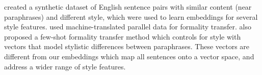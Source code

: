 \citet{patel2024styledistancestrongercontentindependentstyle} %
created a synthetic dataset of English sentence pairs with similar content (near paraphrases) and different style, which were used to learn embeddings for several style features. \citet{lai-etal-2022-multilingual} used machine-translated parallel data for formality transfer. %
\citet{krishna-etal-2022-shot} also proposed a few-shot formality transfer method which controls for style with vectors that model stylistic differences between paraphrases. These vectors are different from our embeddings which map all sentences onto a vector space, %
and address a wider range of style features. %




